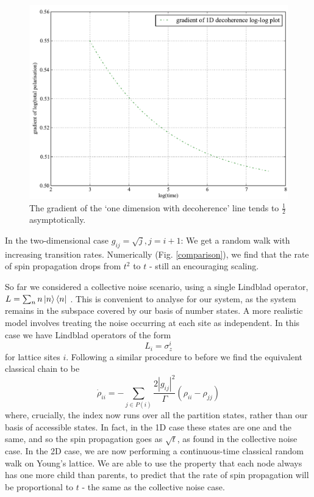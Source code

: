 \begin{figure}
  \begin{center}
    \includegraphics[scale=0.6]{assets/asymptotic_1d.pdf}
  \end{center}
  \caption{ The gradient of the `one dimension with decoherence' line tends to $\frac{1}{2}$ asymptotically.}
  \label{asymptotic_1d}
\end{figure}

In the two-dimensional case $g_{ij} = \sqrt{j}, j=i+1$: We get a random walk with increasing transition rates. Numerically (Fig. \ref{comparison}), we find that the rate of spin propagation drops from $t^2$ to $t$ - still an encouraging scaling.


So far we considered a collective noise scenario, using a single Lindblad operator, $ L=\sum_{n}n\left\vert n\right\rangle\left\langle n\right\vert$ . This is convenient to analyse for our system, as the system remains in the subspace covered by our basis of number states. A more realistic model involves treating the noise occurring at each site as independent. In this case we have Lindblad operators of the form
\begin{equation}
  L_i = \sigma_z^i
\end{equation}
for lattice sites $i$. Following a similar procedure to before we find the equivalent classical chain to be
\begin{equation}
  \dot{\rho}_{ii}=-\sum_{j\in
  P(i)}\frac{2|g_{ij}|^{2}}{\Gamma}\left(\rho_{ii}-\rho_{jj}\right)
  \label{qmat}
\end{equation}
where, crucially, the index now runs over all the partition states, rather than our basis of accessible states. In fact, in the 1D case these states are one and the same, and so the spin propagation goes as $\sqrt{t}$, as found in the collective noise case. In the 2D case, we are now performing a continuous-time classical random walk on Young's lattice. We are able to use the property that each node always has one more child than parents, to predict that the rate of spin propagation will be proportional to $t$ - the same as the collective noise case.  

